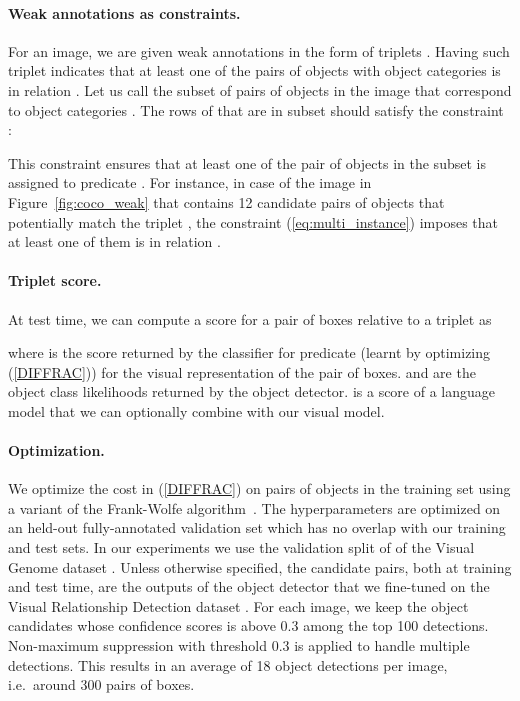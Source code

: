 \documentclass[10pt,twocolumn,letterpaper]{article}
\newcommand{\spaceparagraph}{\vspace{-.35cm}}
\begin{document}
\spaceparagraph
\paragraph{Weak annotations as constraints.} For an image, we are given weak annotations in the form of triplets . Having such triplet  indicates that at least one of the pairs of objects with object categories  is in relation . Let us call  the subset of pairs of objects in the image that correspond to object categories . The rows of  that are in subset  should satisfy the constraint : 
\vspace{-0.2cm}

\vspace{-0.4cm}

This constraint ensures that at least one of the pair of objects in the subset  is assigned to predicate . For instance, in case of the image in Figure~\ref{fig:coco_weak} that contains 12 candidate pairs of objects that potentially match the triplet , the constraint (\ref{eq:multi_instance}) imposes that at least one of them is in relation . 


\spaceparagraph
\paragraph{Triplet score.} 
At test time, we can compute a score for a pair of boxes  relative to a triplet  as

\vspace{-0.4cm}

\noindent where 
is the score returned by the classifier  for predicate  (learnt by optimizing (\ref{DIFFRAC})) for the visual representation  of the pair of boxes.  and  are the object class likelihoods returned by the object detector.  is a score of a language model that we can optionally combine with our visual model. 

\spaceparagraph
\paragraph{Optimization.} We optimize the cost in (\ref{DIFFRAC}) on pairs of objects in the training set using a variant of the Frank-Wolfe algorithm~\cite{miech17,Osokin16}. The hyperparameters  are optimized on an held-out fully-annotated validation set which has no overlap with our training and test sets. In our experiments we use the validation split of \cite{Johnson2015} of the Visual Genome dataset \cite{Krishna2016}. Unless otherwise specified, the candidate pairs, both at training and test time, are the outputs of the object detector \cite{girshick15fastrcnn} that we fine-tuned on the Visual Relationship Detection dataset \cite{Lu16}. For each image, we keep the object candidates whose confidence scores is above 0.3 among the top 100 detections. Non-maximum suppression with threshold 0.3 is applied to handle multiple detections. This results in an average of 18 object detections per image, i.e.\ around 300 pairs of boxes.
\end{document}
